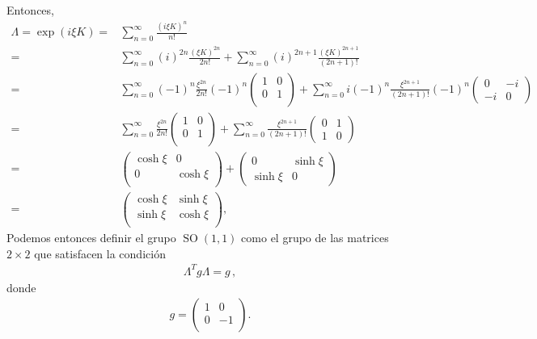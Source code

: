 \begin{frame}
Entonces,
\begin{align}
  \label{eq:km1}
  \Lambda=\exp \left( i \xi K \right)=&\sum_{n=0}^{\infty}\frac{\left(i \xi K \right)^{n}}{n!}\nonumber\\
=&\sum_{n=0}^{\infty}(i)^{2n}\frac{\left( \xi K \right)^{2n}}{2n!}+\sum_{n=0}^{\infty}(i)^{2n+1}\frac{\left( \xi K \right)^{2n+1}}{(2n+1)!}\nonumber\\
  =&\sum_{n=0}^{\infty}(-1)^{n}\frac{\xi^{2n}}{2n!}(-1)^{n}
  \begin{pmatrix}
    1 & 0\\
    0 & 1\\
  \end{pmatrix}
+\sum_{n=0}^{\infty}i(-1)^{n}\frac{ \xi^{2n+1}}{(2n+1)!} (-1)^{n}
\begin{pmatrix}
  0 & -i \\
  -i & 0
\end{pmatrix} 
\nonumber\\
  =&\sum_{n=0}^{\infty}\frac{\xi^{2n}}{2n!}
  \begin{pmatrix}
    1 & 0\\
    0 & 1\\
  \end{pmatrix}
+\sum_{n=0}^{\infty}\frac{ \xi^{2n+1}}{(2n+1)!} 
\begin{pmatrix}
  0 & 1 \\
  1 & 0
\end{pmatrix} 
\nonumber\\
  =&
  \begin{pmatrix}
    \cosh\xi & 0\\
    0 & \cosh\xi \\
  \end{pmatrix}
+
\begin{pmatrix}
  0 & \sinh\xi \\
  \sinh\xi & 0
\end{pmatrix}
\nonumber\\
    =&
  \begin{pmatrix}
    \cosh\xi & \sinh\xi\\
     \sinh\xi& \cosh\xi \\
  \end{pmatrix},
\end{align}
Podemos entonces definir el grupo $\operatorname{SO}(1,1)$ como el grupo de las matrices $2\times2$ que satisfacen la condición
\begin{align}
  \Lambda^T g \Lambda=g\,,
\end{align}
donde
\begin{align}
  g=
  \begin{pmatrix}
    1 & 0\\
    0 & -1\\
  \end{pmatrix}.
\end{align}
\end{frame}

